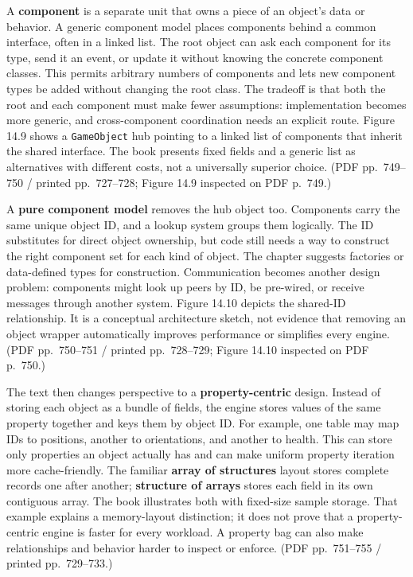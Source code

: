 A \textbf{component} is a separate unit that owns a piece of an object's data or behavior. A generic component model places components behind a common interface, often in a linked list. The root object can ask each component for its type, send it an event, or update it without knowing the concrete component classes. This permits arbitrary numbers of components and lets new component types be added without changing the root class. The tradeoff is that both the root and each component must make fewer assumptions: implementation becomes more generic, and cross-component coordination needs an explicit route. Figure 14.9 shows a \texttt{GameObject} hub pointing to a linked list of components that inherit the shared interface. The book presents fixed fields and a generic list as alternatives with different costs, not a universally superior choice. (PDF pp.~749--750 / printed pp.~727--728; Figure 14.9 inspected on PDF p.~749.)

A \textbf{pure component model} removes the hub object too. Components carry the same unique object ID, and a lookup system groups them logically. The ID substitutes for direct object ownership, but code still needs a way to construct the right component set for each kind of object. The chapter suggests factories or data-defined types for construction. Communication becomes another design problem: components might look up peers by ID, be pre-wired, or receive messages through another system. Figure 14.10 depicts the shared-ID relationship. It is a conceptual architecture sketch, not evidence that removing an object wrapper automatically improves performance or simplifies every engine. (PDF pp.~750--751 / printed pp.~728--729; Figure 14.10 inspected on PDF p.~750.)

The text then changes perspective to a \textbf{property-centric} design. Instead of storing each object as a bundle of fields, the engine stores values of the same property together and keys them by object ID. For example, one table may map IDs to positions, another to orientations, and another to health. This can store only properties an object actually has and can make uniform property iteration more cache-friendly. The familiar \textbf{array of structures} layout stores complete records one after another; \textbf{structure of arrays} stores each field in its own contiguous array. The book illustrates both with fixed-size sample storage. That example explains a memory-layout distinction; it does not prove that a property-centric engine is faster for every workload. A property bag can also make relationships and behavior harder to inspect or enforce. (PDF pp.~751--755 / printed pp.~729--733.)

